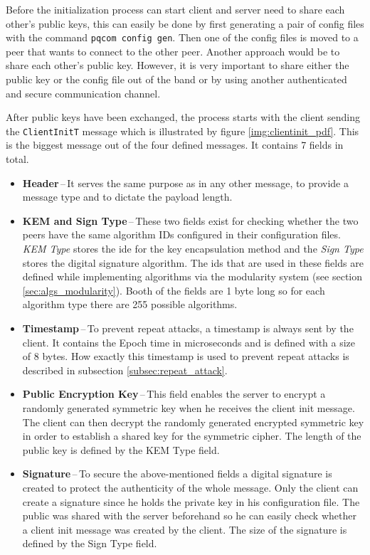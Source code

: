 Before the initialization process can start client and server need to share each other's public keys, this can easily be done by first generating a pair of config files with the command \texttt{pqcom config gen}. Then one of the config files is moved to a peer that wants to connect to the other peer. Another approach would be to share each other's public key. However, it is very important to share either the public key or the config file out of the band or by using another authenticated and secure communication channel.

After public keys have been exchanged, the process starts with the client sending the \texttt{ClientInitT} message which is illustrated by figure \ref{img:clientinit_pdf}. This is the biggest message out of the four defined messages. It contains 7 fields in total.
\begin{itemize}
  \item \textbf{Header}\,--\,It serves the same purpose as in any other message, to provide a message type and to dictate the payload length.
  \item \textbf{KEM and Sign Type}\,--\,These two fields exist for checking whether the two peers have the same algorithm IDs configured in their configuration files. \textit{KEM Type} stores the ide for the key encapsulation method and the \textit{Sign Type} stores the digital signature algorithm. The ids that are used in these fields are defined while implementing algorithms via the modularity system (see section \ref{sec:algs_modularity}). Booth of the fields are 1 byte long so for each algorithm type there are 255 possible algorithms.
  \item \textbf{Timestamp}\,--\,To prevent repeat attacks, a timestamp is always sent by the client. It contains the Epoch time in microseconds and is defined with a size of 8 bytes. How exactly this timestamp is used to prevent repeat attacks is described in subsection \ref{subsec:repeat_attack}.
  \item \textbf{Public Encryption Key}\,--\,This field enables the server to encrypt a randomly generated symmetric key when he receives the client init message. The client can then decrypt the randomly generated encrypted symmetric key in order to establish a shared key for the symmetric cipher. The length of the public key is defined by the KEM Type field.
  \item \textbf{Signature}\,--\,To secure the above-mentioned fields a digital signature is created to protect the authenticity of the whole message. Only the client can create a signature since he holds the private key in his configuration file. The public was shared with the server beforehand so he can easily check whether a client init message was created by the client. The size of the signature is defined by the Sign Type field.
\end{itemize}

